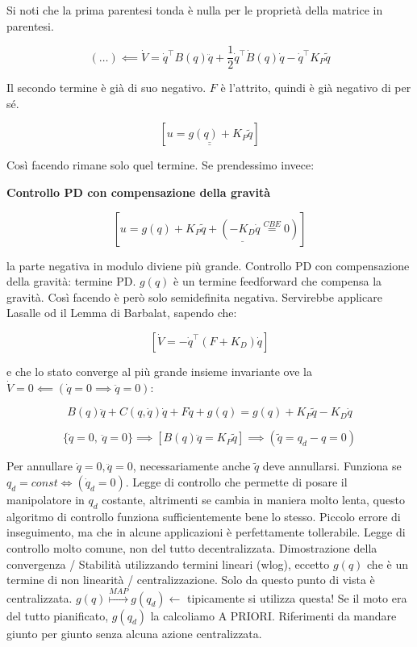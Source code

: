 Si noti che la prima parentesi tonda è nulla per le proprietà della matrice in parentesi.

\[
	(\dots)\impliedby \dot{V} = \dot{q}^\top B(q)\ddot{q} + \frac{1}{2}\dot{q}^\top \dot{B}(q)\dot{q} - \dot{q}^\top K_P\tilde{q}
\]

Il secondo termine è già di suo negativo. $F$ è l'attrito, quindi è già negativo di per sé.

\[
	[\underline{\underline{u = g(q) + K_P\tilde{q}}}]
\]

Così facendo rimane solo quel termine. Se prendessimo invece:

\begin{defn}{\textbf{Controllo PD con compensazione della gravità}}

\[
	[u = g(q) + \underline{K_P\tilde{q} + (-K_D\dot{q} \stackrel{CBE}{=} 0)}]
\]

\end{defn}

la parte negativa in modulo diviene più grande. Controllo PD con compensazione della gravità: termine PD. $g(q)$ è un termine feedforward che compensa la gravità. Così facendo è però solo semidefinita negativa. Servirebbe applicare Lasalle od il Lemma di Barbalat, sapendo che:

\[
	[\dot{V} = -\dot{q}^\top (F+K_D)\dot{q}]
\]

e che lo stato converge al più grande insieme invariante ove la $\dot{V}=0 \impliedby (\dot{q}=0 \implies \ddot{q}=0)$:

\[
	B(q)\ddot{q} + C(q,\dot{q})\dot{q} + F\dot{q} + g(q) = g(q) + K_P\tilde{q} - K_D\dot{q}
\]

\[
	\{\dot{q}=0,\ \ddot{q}=0\} \implies [B(q)\ddot{q} = K_P\tilde{q}] \implies (\tilde{q}=q_d-q=0)
\]

Per annullare $\dot{q}=0,\ddot{q}=0$, necessariamente anche $\tilde{q}$ deve annullarsi. Funziona se $q_d=const\iff (\dot{q}_d=0)$. Legge di controllo che permette di posare il manipolatore in $q_d$ costante, altrimenti se cambia in maniera molto lenta, questo algoritmo di controllo funziona sufficientemente bene lo stesso. Piccolo errore di inseguimento, ma che in alcune applicazioni è perfettamente tollerabile. Legge di controllo molto comune, non del tutto decentralizzata. Dimostrazione della convergenza / Stabilità utilizzando termini lineari (wlog), eccetto $g(q)$ che è un termine di non linearità / centralizzazione. Solo da questo punto di vista è centralizzata. $g(q)\stackrel{MAP}{\mapsto} g(q_d)\leftarrow$ tipicamente si utilizza questa! Se il moto era del tutto pianificato, $g(q_d)$ la calcoliamo A PRIORI. Riferimenti da mandare giunto per giunto senza alcuna azione centralizzata.

